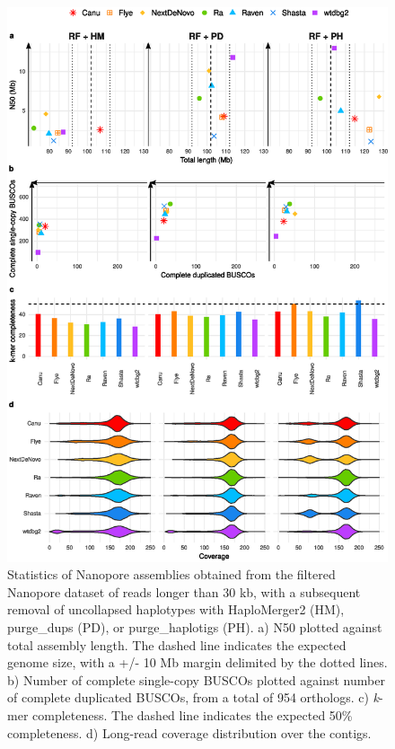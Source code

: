     \begin{figure}[ht]
    \centering
     \includegraphics[width=13.5cm]{fig/benchmark/supp_nanopore_filtering_purging_v20201012.eps}
   \caption{Statistics of Nanopore assemblies obtained from the filtered Nanopore dataset of reads longer than 30 kb, with a subsequent removal of uncollapsed haplotypes with HaploMerger2 (HM), purge\_dups (PD), or purge\_haplotigs (PH). a) N50 plotted against total assembly length. The dashed line indicates the expected genome size, with a +/- 10 Mb margin delimited by the dotted lines. b) Number of complete single-copy BUSCOs plotted against number of complete duplicated BUSCOs, from a total of 954 orthologs. c) \textit{k}-mer completeness. The dashed line indicates the expected 50\% completeness. d) Long-read coverage distribution over the contigs.}
   \label{fig:nanopore_filtering_purging}
 \end{figure}
 
